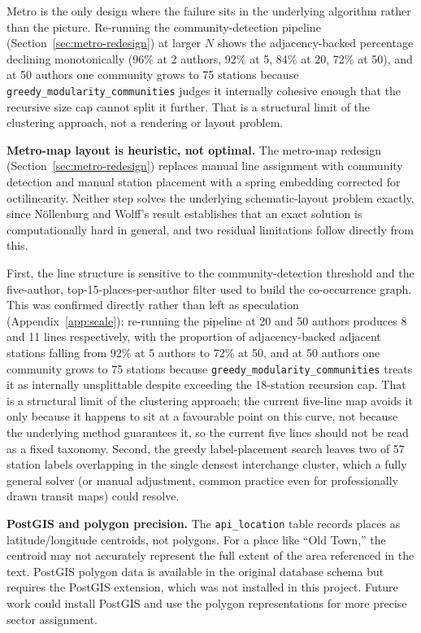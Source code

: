 \documentclass[logo,msc]{infthesis}
\begin{document}
Metro is the only design where the failure sits in the underlying algorithm rather than the picture. Re-running the community-detection pipeline (Section~\ref{sec:metro-redesign}) at larger $N$ shows the adjacency-backed percentage declining monotonically (96\% at 2 authors, 92\% at 5, 84\% at 20, 72\% at 50), and at 50 authors one community grows to 75 stations because \texttt{greedy\_modularity\_communities} judges it internally cohesive enough that the recursive size cap cannot split it further. That is a structural limit of the clustering approach, not a rendering or layout problem.
 
\textbf{Metro-map layout is heuristic, not optimal.} The metro-map redesign (Section~\ref{sec:metro-redesign}) replaces manual line assignment with community detection and manual station placement with a spring embedding corrected for octilinearity. Neither step solves the underlying schematic-layout problem exactly, since N{\"o}llenburg and Wolff's result \cite{nollenburg2006} establishes that an exact solution is computationally hard in general, and two residual limitations follow directly from this.

First, the line structure is sensitive to the community-detection threshold and the five-author, top-15-places-per-author filter used to build the co-occurrence graph. This was confirmed directly rather than left as speculation (Appendix~\ref{app:scale}): re-running the pipeline at 20 and 50 authors produces 8 and 11 lines respectively, with the proportion of adjacency-backed adjacent stations falling from 92\% at 5 authors to 72\% at 50, and at 50 authors one community grows to 75 stations because \texttt{greedy\_modularity\_communities} treats it as internally unsplittable despite exceeding the 18-station recursion cap. That is a structural limit of the clustering approach; the current five-line map avoids it only because it happens to sit at a favourable point on this curve, not because the underlying method guarantees it, so the current five lines should not be read as a fixed taxonomy. Second, the greedy label-placement search leaves two of 57 station labels overlapping in the single densest interchange cluster, which a fully general solver (or manual adjustment, common practice even for professionally drawn transit maps) could resolve.

\textbf{PostGIS and polygon precision.} The \texttt{api\_location} table records places as latitude/longitude centroids, not polygons. For a place like ``Old Town,'' the centroid may not accurately represent the full extent of the area referenced in the text. PostGIS polygon data is available in the original database schema but requires the PostGIS extension, which was not installed in this project. Future work could install PostGIS and use the polygon representations for more precise sector assignment.
 
\end{document}
